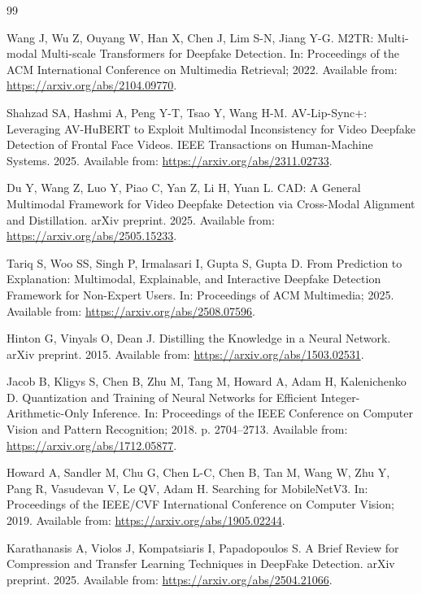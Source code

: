 \documentclass[pdflatex,sn-basic,Numbered]{sn-jnl}
\begin{document}
\begin{thebibliography}{99}

Wang J, Wu Z, Ouyang W, Han X, Chen J, Lim S-N, Jiang Y-G. M2TR: Multi-modal Multi-scale Transformers for Deepfake Detection. In: Proceedings of the ACM International Conference on Multimedia Retrieval; 2022. Available from: \url{https://arxiv.org/abs/2104.09770}.

Shahzad SA, Hashmi A, Peng Y-T, Tsao Y, Wang H-M. AV-Lip-Sync+: Leveraging AV-HuBERT to Exploit Multimodal Inconsistency for Video Deepfake Detection of Frontal Face Videos. IEEE Transactions on Human-Machine Systems. 2025. Available from: \url{https://arxiv.org/abs/2311.02733}.

Du Y, Wang Z, Luo Y, Piao C, Yan Z, Li H, Yuan L. CAD: A General Multimodal Framework for Video Deepfake Detection via Cross-Modal Alignment and Distillation. arXiv preprint. 2025. Available from: \url{https://arxiv.org/abs/2505.15233}.

Tariq S, Woo SS, Singh P, Irmalasari I, Gupta S, Gupta D. From Prediction to Explanation: Multimodal, Explainable, and Interactive Deepfake Detection Framework for Non-Expert Users. In: Proceedings of ACM Multimedia; 2025. Available from: \url{https://arxiv.org/abs/2508.07596}.

Hinton G, Vinyals O, Dean J. Distilling the Knowledge in a Neural Network. arXiv preprint. 2015. Available from: \url{https://arxiv.org/abs/1503.02531}.

Jacob B, Kligys S, Chen B, Zhu M, Tang M, Howard A, Adam H, Kalenichenko D. Quantization and Training of Neural Networks for Efficient Integer-Arithmetic-Only Inference. In: Proceedings of the IEEE Conference on Computer Vision and Pattern Recognition; 2018. p. 2704--2713. Available from: \url{https://arxiv.org/abs/1712.05877}.

Howard A, Sandler M, Chu G, Chen L-C, Chen B, Tan M, Wang W, Zhu Y, Pang R, Vasudevan V, Le QV, Adam H. Searching for MobileNetV3. In: Proceedings of the IEEE/CVF International Conference on Computer Vision; 2019. Available from: \url{https://arxiv.org/abs/1905.02244}.

Karathanasis A, Violos J, Kompatsiaris I, Papadopoulos S. A Brief Review for Compression and Transfer Learning Techniques in DeepFake Detection. arXiv preprint. 2025. Available from: \url{https://arxiv.org/abs/2504.21066}.


\end{thebibliography}
\end{document}
